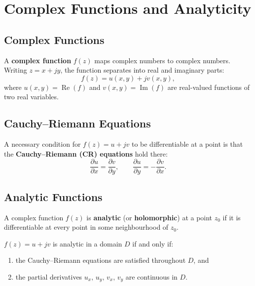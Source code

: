\chapter{Complex Functions and Analyticity}

\section{Complex Functions}

\begin{definition}
A \textbf{complex function} $f(z)$ maps complex numbers to complex numbers. Writing
$z = x + jy$, the function separates into real and imaginary parts:
\[
  f(z) = u(x,y) + jv(x,y),
\]
where $u(x,y) = \operatorname{Re}(f)$ and $v(x,y) = \operatorname{Im}(f)$ are real-valued
functions of two real variables.
\end{definition}

\section{Cauchy--Riemann Equations}

\begin{theorem}
A necessary condition for $f(z) = u + jv$ to be differentiable at a point is that
the \textbf{Cauchy--Riemann (CR) equations} hold there:
\[
  \frac{\partial u}{\partial x} = \frac{\partial v}{\partial y}, \qquad
  \frac{\partial u}{\partial y} = -\frac{\partial v}{\partial x}.
\]
\end{theorem}

\section{Analytic Functions}

\begin{definition}
A complex function $f(z)$ is \textbf{analytic} (or \textbf{holomorphic}) at a point $z_0$
if it is differentiable at every point in some neighbourhood of $z_0$.
\end{definition}

\begin{theorem}
$f(z) = u + jv$ is analytic in a domain $D$ if and only if:
\begin{enumerate}
  \item the Cauchy--Riemann equations are satisfied throughout $D$, and
  \item the partial derivatives $u_x,\, u_y,\, v_x,\, v_y$ are continuous in $D$.
\end{enumerate}
\end{theorem}

